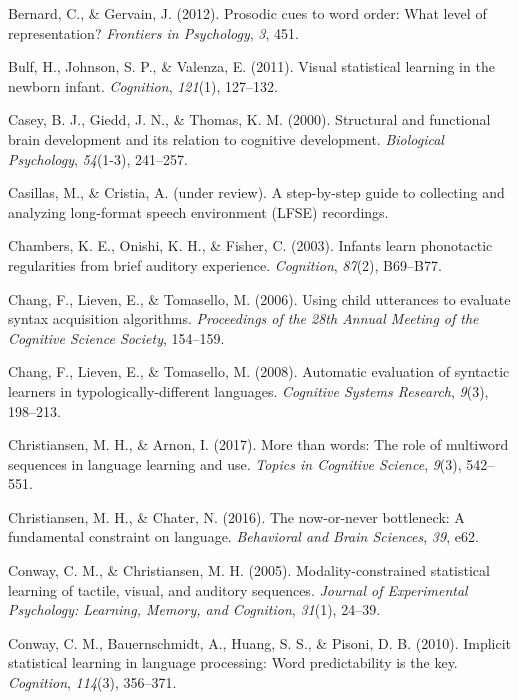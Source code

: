 \documentclass[man,mask,floatsintext]{apa6}
\begin{document}
\hypertarget{ref-bernard2012prosodic}{}
Bernard, C., \& Gervain, J. (2012). Prosodic cues to word order: What
level of representation? \emph{Frontiers in Psychology}, \emph{3}, 451.

\hypertarget{ref-bulf2011visual}{}
Bulf, H., Johnson, S. P., \& Valenza, E. (2011). Visual statistical
learning in the newborn infant. \emph{Cognition}, \emph{121}(1),
127--132.

\hypertarget{ref-casey2000structural}{}
Casey, B. J., Giedd, J. N., \& Thomas, K. M. (2000). Structural and
functional brain development and its relation to cognitive development.
\emph{Biological Psychology}, \emph{54}(1-3), 241--257.

\hypertarget{ref-casillasURstep}{}
Casillas, M., \& Cristia, A. (under review). A step-by-step guide to
collecting and analyzing long-format speech environment (LFSE)
recordings.

\hypertarget{ref-chambers2003infants}{}
Chambers, K. E., Onishi, K. H., \& Fisher, C. (2003). Infants learn
phonotactic regularities from brief auditory experience.
\emph{Cognition}, \emph{87}(2), B69--B77.

\hypertarget{ref-chang2006using}{}
Chang, F., Lieven, E., \& Tomasello, M. (2006). Using child utterances
to evaluate syntax acquisition algorithms. \emph{Proceedings of the 28th
Annual Meeting of the Cognitive Science Society}, 154--159.

\hypertarget{ref-chang2008automatic}{}
Chang, F., Lieven, E., \& Tomasello, M. (2008). Automatic evaluation of
syntactic learners in typologically-different languages. \emph{Cognitive
Systems Research}, \emph{9}(3), 198--213.

\hypertarget{ref-christiansen2017more}{}
Christiansen, M. H., \& Arnon, I. (2017). More than words: The role of
multiword sequences in language learning and use. \emph{Topics in
Cognitive Science}, \emph{9}(3), 542--551.

\hypertarget{ref-christiansen2016now}{}
Christiansen, M. H., \& Chater, N. (2016). The now-or-never bottleneck:
A fundamental constraint on language. \emph{Behavioral and Brain
Sciences}, \emph{39}, e62.

\hypertarget{ref-conway2005modality}{}
Conway, C. M., \& Christiansen, M. H. (2005). Modality-constrained
statistical learning of tactile, visual, and auditory sequences.
\emph{Journal of Experimental Psychology: Learning, Memory, and
Cognition}, \emph{31}(1), 24--39.

\hypertarget{ref-conway2010implicit}{}
Conway, C. M., Bauernschmidt, A., Huang, S. S., \& Pisoni, D. B. (2010).
Implicit statistical learning in language processing: Word
predictability is the key. \emph{Cognition}, \emph{114}(3), 356--371.
\end{document}
